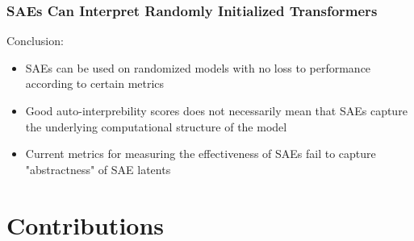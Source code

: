\documentclass{beamer}
\begin{document}
\begin{frame}
    \frametitle{SAEs Can Interpret Randomly Initialized Transformers}
    Conclusion:
    \begin{itemize}
        \item SAEs can be used on randomized models with no loss to performance according to certain metrics
        \item Good auto-interprebility scores does not necessarily mean that SAEs capture the underlying computational structure of the model
        \item Current metrics for measuring the effectiveness of SAEs fail to capture "abstractness" of SAE latents
    \end{itemize} 
\end{frame}



\section{Contributions}
\end{document}
